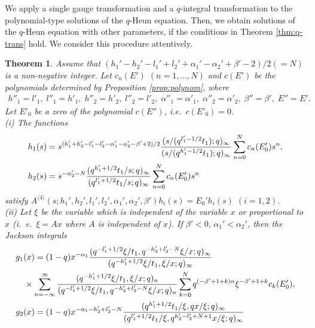 \documentclass[12pt]{amsart}
\numberwithin{equation}{section}
\newtheorem{thm}{Theorem}[section]
\theoremstyle{definition}
\theoremstyle{remark}
\begin{document}
We apply a single gauge transformation and a $q$-integral transformation to the polynomial-type solutions of the $q$-Heun equation.
Then, we obtain solutions of the $q$-Heun equation with other parameters, if the conditions in Theorem \ref{thm:q-trans} hold.
We consider this procedure attentively.
\begin{thm} \label{thm:polynom1gauge}
Assume that $( h_{1}' - h_{2}' -l_{1}' + l_{2}' + \alpha_{1}' - \alpha_{2}' + \beta' - 2)/2 (=N)$ is a non-negative integer.
Let $c_n(E')$ $(n=1,\dots ,N)$ and $c (E')$ be the polynomials determined by Proposition \ref{prop:polynom}, where
\begin{align*}
h''_{1} = l' _1, \;  l''_{1} = h' _1, \; h''_{2} = h' _2, \; l''_{2} = l' _2, \; \alpha ''_{1} = \alpha '_{1} , \; \alpha ''_{2} = \alpha '_{2} , \; \beta '' = \beta ' , \;  E''=E'.
\end{align*}
Let $E'_0$ be a zero of the polynomial $c (E'') $, i.e.~$c(E'_0 )=0$.
\\
(i) The functions 
 \begin{align} \label{eq:1h1h2}
& h_1 (s) = s^{(h_{1}' + h_{2}' - l_{1}' - l_{2}' - \alpha_{1}' - \alpha_{2}' - \beta' + 2)/2 } \frac{(s/(q^{l_{1}' - 1/2}t_{1}); q)_\infty}{(s/(q^{h_{1}' - 1/2}t_{1}); q)_\infty} \sum_{n = 0}^{N} c_{n} (E'_0) s^{n} ,\\
& h_2 (s)= s^{- \alpha_{2}' -N} \frac{(q^{h_{1}' + 1/2}t_{1}/s; q)_\infty}{(q^{l_{1}' + 1/2}t_{1}/s; q)_\infty} \sum_{n = 0}^{N} c_{n} (E'_0) s^{n} \notag
  \end{align}
satisfy $A^{\langle 4 \rangle} (s; h_{1}', h_{2}', l_{1}', l_{2}', \alpha_{1}', \alpha_{2}', \beta') h _i (s) = E_{0}' h_i (s)$ $(i=1,2)$.
\\
(ii) Let $\xi $ be the variable which is independent of the variable $x$ or proportional to $x$ (i.~e.~$\xi =Ax$ where $A $ is independent of $x$).
If $\beta' < 0, \, \alpha_{1}' < \alpha_{2}'$, then the Jackson integrals
    \begin{align}
      &g _1 (x) = (1 - q)x^{-\alpha_{1}} \frac{(q^{-l_{1}' + 1/2}\xi/t_{1}, q^{-h_{2}' + l_{2}' - N}\xi/x; q)_{\infty}}{(q^{-h_{1}' + 1/2}\xi/t_{1}, \xi/x; q)_{\infty}} \label{eq:1g1g2} \\
      &\quad \times \sum_{n = -\infty}^{\infty} \frac{(q^{-h_{1}' + 1/2}\xi/t_{1}, \xi/x; q)_{n}}{(q^{-l_{1}' + 1/2}\xi/t_{1}, q^{-h_{2}' + l_{2}' - N}\xi/x; q)_{n}} \sum_{k = 0}^{N} q^{(-\beta' + 1 +k )n} \xi^{-\beta' + 1 +k} c_{k} (E'_0 ) , \notag \\
      &g _2 (x) = (1 - q) x^{-\alpha_{1} - h_{2}' + l_{2}' - N} \frac{(q^{h_{1}' + 1/2}t_{1}/\xi, qx/\xi; q)_{\infty}}{(q^{l_{1}' + 1/2}t_{1}/\xi, q^{h_{2}' - l_{2}' + N + 1}x/\xi; q)_{\infty}}  \notag \\

\end{align}
\end{thm}
\end{document}
